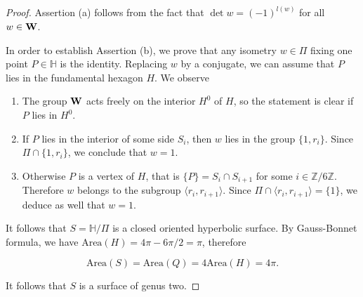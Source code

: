 \documentclass[10pt,a4paper]{amsart}
\newcommand{\HP}{\mathbb{H}}
\newcommand{\Z}{\mathbb{Z}}
\newcommand{\Area}{\mathrm{Area}}
\begin{document}

\begin{proof} Assertion (a) follows from the fact that
$\det w= (-1)^{l(w)}$ for all $w\in {\bf W}$.

In order to establish Assertion (b), we prove that any
isometry $w\in \Pi$ fixing one point $P\in \HP$ is the identity. Replacing $w$ by a conjugate, we can assume that $P$ lies in the fundamental hexagon $H$. 
We observe

\begin{enumerate}
\item[(a)]
The group ${\bf W}$ acts freely on the interior $H^0$ of $H$, so the statement is clear if $P$ lies in $H^0$. 

\item[(b)]
If $P$ lies in the interior 
of some side $S_i$, then $w$ lies in the group 
$\{1, r_i\}$. Since
$\Pi\cap \{1, r_i\}$, we conclude that $w=1$.

\item[(c)]
Otherwise $P$ is a vertex of $H$, that is 
$\{P\}=S_i\cap S_{i+1}$ for some $i\in\Z/6\Z$.  Therefore $w$ belongs to the subgroup $\langle r_i, r_{i+1}\rangle$. 
Since
$\Pi\cap \langle r_i, r_{i+1}\rangle=\{1\}$, we deduce as well that $w=1$.
\end{enumerate}

It follows that $S=\HP/\Pi$ is a closed oriented hyperbolic 
surface. By Gauss-Bonnet formula,
we have $\Area(H)=4\pi-6\pi/2=\pi$, therefore

$$\Area(S)=\Area(Q)=4 \Area(H)=4\pi.$$

\noindent It follows that  $S$ is a surface of genus two.
\end{proof}
\end{document}
